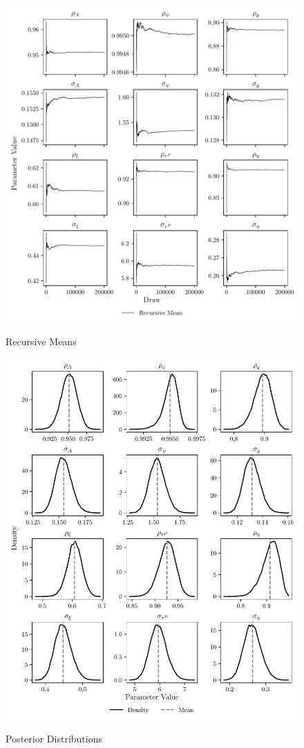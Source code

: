 \begin{figure}[ht]
    \centering
    \caption{Recursive Means}
    \includegraphics{figures/recursive_means.pdf}
    \label{fig:recursive-means}
\end{figure}

\begin{figure}[ht]
    \centering
    \caption{Posterior Distributions}
    \includegraphics{figures/posteriors.pdf}
    \label{fig:posteriors}
\end{figure}

